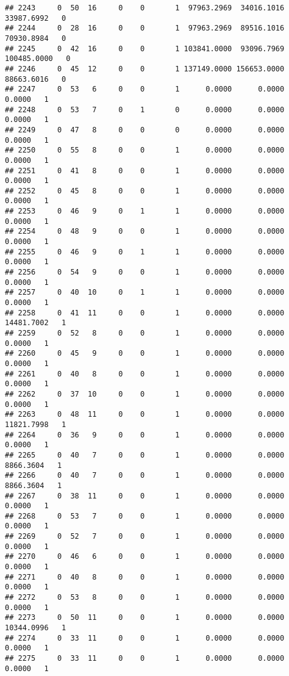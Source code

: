 \documentclass[
]{article}
\begin{document}
\begin{enumerate}
\begin{verbatim}
## 2243     0  50  16     0    0       1  97963.2969  34016.1016  33987.6992   0
## 2244     0  28  16     0    0       1  97963.2969  89516.1016  70930.8984   0
## 2245     0  42  16     0    0       1 103841.0000  93096.7969 100485.0000   0
## 2246     0  45  12     0    0       1 137149.0000 156653.0000  88663.6016   0
## 2247     0  53   6     0    0       1      0.0000      0.0000      0.0000   1
## 2248     0  53   7     0    1       0      0.0000      0.0000      0.0000   1
## 2249     0  47   8     0    0       0      0.0000      0.0000      0.0000   1
## 2250     0  55   8     0    0       1      0.0000      0.0000      0.0000   1
## 2251     0  41   8     0    0       1      0.0000      0.0000      0.0000   1
## 2252     0  45   8     0    0       1      0.0000      0.0000      0.0000   1
## 2253     0  46   9     0    1       1      0.0000      0.0000      0.0000   1
## 2254     0  48   9     0    0       1      0.0000      0.0000      0.0000   1
## 2255     0  46   9     0    1       1      0.0000      0.0000      0.0000   1
## 2256     0  54   9     0    0       1      0.0000      0.0000      0.0000   1
## 2257     0  40  10     0    1       1      0.0000      0.0000      0.0000   1
## 2258     0  41  11     0    0       1      0.0000      0.0000  14481.7002   1
## 2259     0  52   8     0    0       1      0.0000      0.0000      0.0000   1
## 2260     0  45   9     0    0       1      0.0000      0.0000      0.0000   1
## 2261     0  40   8     0    0       1      0.0000      0.0000      0.0000   1
## 2262     0  37  10     0    0       1      0.0000      0.0000      0.0000   1
## 2263     0  48  11     0    0       1      0.0000      0.0000  11821.7998   1
## 2264     0  36   9     0    0       1      0.0000      0.0000      0.0000   1
## 2265     0  40   7     0    0       1      0.0000      0.0000   8866.3604   1
## 2266     0  40   7     0    0       1      0.0000      0.0000   8866.3604   1
## 2267     0  38  11     0    0       1      0.0000      0.0000      0.0000   1
## 2268     0  53   7     0    0       1      0.0000      0.0000      0.0000   1
## 2269     0  52   7     0    0       1      0.0000      0.0000      0.0000   1
## 2270     0  46   6     0    0       1      0.0000      0.0000      0.0000   1
## 2271     0  40   8     0    0       1      0.0000      0.0000      0.0000   1
## 2272     0  53   8     0    0       1      0.0000      0.0000      0.0000   1
## 2273     0  50  11     0    0       1      0.0000      0.0000  10344.0996   1
## 2274     0  33  11     0    0       1      0.0000      0.0000      0.0000   1
## 2275     0  33  11     0    0       1      0.0000      0.0000      0.0000   1

\end{verbatim}
\end{enumerate}
\end{document}

